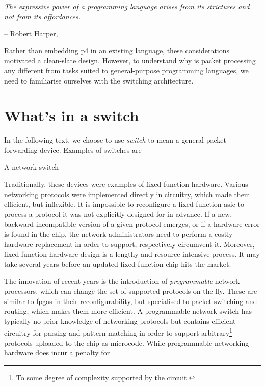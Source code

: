 \begin{displayquote}
	\textit{The expressive power of a programming language arises from its
	strictures and \emph{not} from its affordances.}

	-- Robert Harper,  \cite{pfpl1oplss2019}
\end{displayquote}

Rather than embedding \acrshort{p4} in an existing language, these
considerations motivated a clean-slate design. However, to understand why is
packet processing any different from tasks suited to general-purpose programming
languages, we need to familiarise ourselves with the switching architecture.

\section{What's in a switch}

In the following text, we choose to use \emph{switch} to mean a general packet
forwarding device. Examples of switches are

A network switch

Traditionally, these devices were examples of fixed-function hardware. Various
networking protocols were implemented directly in circuitry, which made them
efficient, but inflexible. It is impossible to reconfigure a fixed-function
\acrshort{asic} to process a protocol it was not explicitly designed for in
advance. If a new, backward-incompatible version of a given protocol emerges, or
if a hardware error is found in the chip, the network administrators need to
perform a costly hardware replacement in order to support, respectively
circumvent it. Moreover, fixed-function hardware design is a lengthy and
resource-intensive process. It may take several years before an updated
fixed-function chip hits the market.

The innovation of recent years is the introduction of \emph{programmable}
network processors, which can change the set of supported protocols on the fly.
These are similar to \acrshort{fpga}s in their reconfigurability, but
specialised to packet switching and routing, which makes them more efficient. A
programmable network switch has typically no prior knowledge of networking
protocols but contains efficient circuitry for parsing and pattern-matching in
order to support arbitrary\footnote{To some degree of complexity supported by
the circuit.} protocols uploaded to the chip as microcode. While programmable
networking hardware does incur a penalty for

